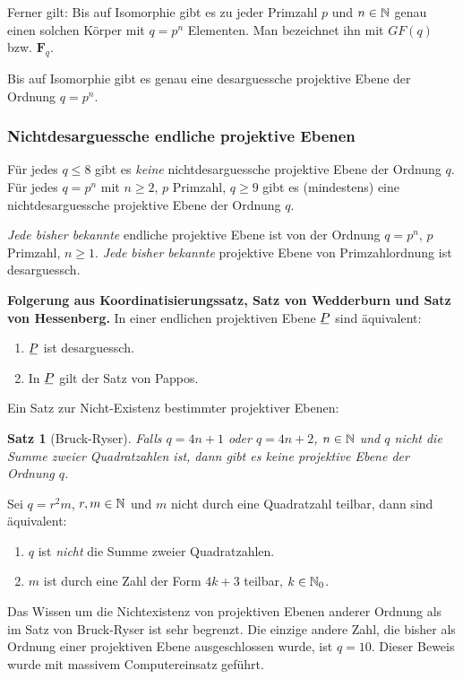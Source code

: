 \documentclass[
 a4paper,
 12pt,
 parskip=half
 ]{scrartcl}
\theoremstyle{plain}
\newtheorem*{thm*}{Satz}
\theoremstyle{definition}
\begin{document}
Ferner gilt: Bis auf Isomorphie gibt es zu jeder Primzahl $p$ und $n \in \mathbb{N}$ genau einen solchen Körper mit $q = p^n$ Elementen. Man bezeichnet ihn mit $GF(q)$ bzw. $\mathbf{F}_q$.

Bis auf Isomorphie gibt es genau eine desarguessche projektive Ebene der Ordnung $q = p^n$.

\subsubsection*{Nichtdesarguessche endliche projektive Ebenen}
Für jedes $q \le 8$ gibt es \emph{keine} nichtdesarguessche projektive Ebene der Ordnung $q$. Für jedes $q = p^n$ mit $n \ge 2$, $p$ Primzahl, $q \ge 9$ gibt es (mindestens) eine nichtdesarguessche projektive Ebene der Ordnung $q$.

\emph{Jede bisher bekannte} endliche projektive Ebene ist von der Ordnung $q = p^n$, $p$ Primzahl, $n \ge 1$. \emph{Jede bisher bekannte} projektive Ebene von Primzahlordnung ist desarguessch.

\textbf{Folgerung aus Koordinatisierungssatz, Satz von Wedderburn und Satz von Hessenberg.}
In einer endlichen projektiven Ebene $\proj$ sind äquivalent:
\begin{enumerate}[(1)]
 \item $\proj$ ist desarguessch.
 \item In $\proj$ gilt der Satz von Pappos.
\end{enumerate}

Ein Satz zur Nicht-Existenz bestimmter projektiver Ebenen:
\begin{thm*}[Bruck-Ryser]
 Falls $q = 4n+1$ oder $q = 4n+2$, $n \in \mathbb{N}$ \emph{und} $q$ nicht die Summe zweier Quadratzahlen ist, dann gibt es \emph{keine} projektive Ebene der Ordnung $q$.
\end{thm*}

\begin{bem}
 Sei $q = r^2 m$, $r,m \in \mathbb{N}$ und $m$ nicht durch eine Quadratzahl teilbar, dann sind äquivalent:
 \begin{enumerate}[(1)]
  \item $q$ ist \emph{nicht} die Summe zweier Quadratzahlen.
  \item $m$ ist durch eine Zahl der Form $4k+3$ teilbar, $k \in \mathbb{N}_0$.
 \end{enumerate}
\end{bem}

Das Wissen um die Nichtexistenz von projektiven Ebenen anderer Ordnung als im Satz von Bruck-Ryser ist sehr begrenzt. Die einzige andere Zahl, die bisher als Ordnung einer projektiven Ebene ausgeschlossen wurde, ist $q = 10$. Dieser Beweis wurde mit massivem Computereinsatz geführt.
\end{document}
